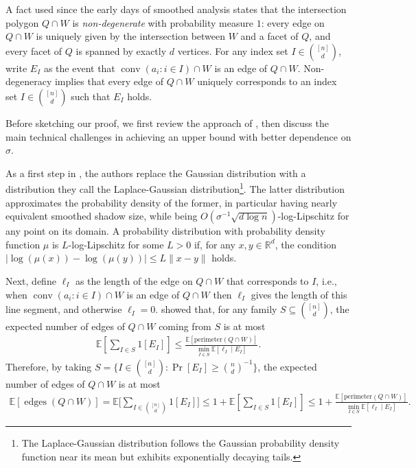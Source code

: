 \documentclass{theoretics}
\newcommand{\R}{\mathbb R}
\newcommand{\E}{\mathbb E}
\newcommand{\conv}{\operatorname{conv}}
\newcommand{\edges}{\operatorname{edges}}
\begin{document}
A fact used since the early days of smoothed analysis \cite{ST04} states that the intersection polygon $Q \cap W$ is \emph{non-degenerate} with probability measure $1$:
every edge on $Q \cap W$ is uniquely given by the intersection between $W$ and a facet of $Q$,
and every facet of $Q$ is spanned by exactly $d$ vertices.
For any index set $I \in \binom{[n]}{d}$, write $E_I$ as the event that $\conv(a_i : i\in I) \cap W$ is an edge of $Q \cap W$.
Non-degeneracy implies that every edge of $Q \cap W$ uniquely corresponds to an index set $I \in \binom{[n]}{d}$ such that $E_I$ holds.


Before sketching our proof, we first review the approach of \cite{DH18}, then discuss the main technical challenges in achieving an upper bound with better dependence on $\sigma$.

As a first step in \cite{DH18}, the authors replace the Gaussian distribution with a distribution they call the
Laplace-Gaussian distribution\footnote{The Laplace-Gaussian distribution follows the Gaussian probability density function near its mean but exhibits exponentially decaying tails.}.
 The latter distribution approximates the probability density of the former, in
 particular having nearly equivalent smoothed shadow size, while being
$O(\sigma^{-1}\sqrt{d\log n})$-log-Lipschitz for any point on its domain.
A probability distribution with probability density function $\mu$ is
$L$-log-Lipschitz for some $L > 0$ if, for any $x, y\in \R^d$, the condition
$|\log(\mu(x)) - \log(\mu(y))| \leq L\|x - y\|$ holds.


Next, define $\ell_I$ as the length of the edge on $Q \cap W$ that corresponds to $I$, i.e., when $\conv(a_i : i\in I) \cap W$ is an edge of $Q \cap W$ then $\ell_I$ gives the length of this line segment, and otherwise $\ell_I = 0$.
\cite{DH18} showed that, for any family $S \subseteq \binom{[n]}{d}$,
the expected number of edges of $Q \cap W$ coming from $S$ is at most
\begin{align}
    \E\left[\sum_{I \in S} 1[E_I]\right] \leq \frac{\E[\mathrm{perimeter}(Q \cap W)]}{\min_{I \in S} \E[\ell_I \mid E_I]}.
    \label{eq:counting-strategy-length}
\end{align}
Therefore, by taking $S = \{I \in\binom{[n]}{d}: \Pr[E_I] \geq \binom n d ^{-1}\}$, the expected number of edges of $Q \cap W$ is at most
\begin{align}
\E[\edges(Q \cap W)] = \E\Bigg[\sum_{I \in \binom{[n]}{d}} 1[E_I]\Bigg] \leq 1 + \E\left[\sum_{I \in S} 1[E_I]\right] \leq 1 + \frac{\E[\mathrm{perimeter}(Q \cap W)]}{\min_{I \in S} \E[\ell_I \mid E_I]}.
    \label{eq:counting-strategy-old}
\end{align}
\end{document}
